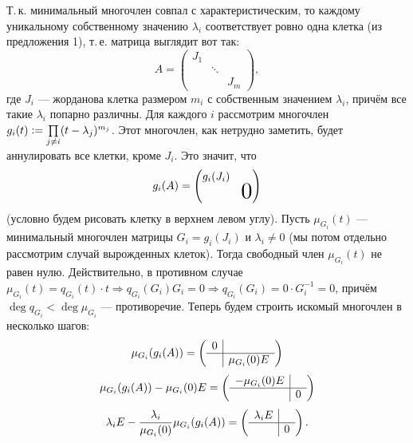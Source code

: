 \smallskip
{}
    Т.\,к. минимальный многочлен совпал с характеристическим, то каждому уникальному собственному значению $\lambda_i$ соответствует ровно одна клетка (из предложения 1), т.\,е. матрица выглядит вот так:
    \[
        A =
        \begin{pmatrix}
            J_1 & & \\
             & \ddots & \\
             & & J_m
        \end{pmatrix},
    \]
    где $J_i$ --- жорданова клетка размером $m_i$ с собственным значением $\lambda_i$, причём все такие $\lambda_i$ попарно различны. Для каждого $i$ рассмотрим многочлен $g_i(t) \vcentcolon = \prod\limits_{j \ne i}(t - \lambda_j)^{m_j}$. Этот многочлен, как нетрудно заметить, будет аннулировать все клетки, кроме $J_i$. Это значит, что
    \[
        g_i(A) =
        \begin{pmatrix}
            g_i(J_i) & \\
             & \scalebox{2}{$0$}
        \end{pmatrix}
    \]
    (условно будем рисовать клетку в верхнем левом углу). Пусть $\mu_{G_i}(t)$ --- минимальный многочлен матрицы $G_i = g_i(J_i)$ и $\lambda_i \ne 0$ (мы потом отдельно рассмотрим случай вырожденных клеток). Тогда свободный член $\mu_{G_i}(t)$ не равен нулю. Действительно, в противном случае $\mu_{G_i}(t) = q_{G_i}(t) \cdot t \Rightarrow q_{G_i}(G_i)G_i = 0 \Rightarrow q_{G_i}(G_i) = 0 \cdot G_i^{-1} = 0$, причём $\deg q_{G_i} < \deg \mu_{G_i}$ --- противоречие. Теперь будем строить искомый многочлен в несколько шагов:
    \[
        \mu_{G_i}(g_i(A)) =
        \left(
        \begin{array}{c | c}
            0 & \\
            \hline
             & \mu_{G_i}(0)E
        \end{array}
        \right)
    \]
    \[
        \mu_{G_i}(g_i(A)) - \mu_{G_i}(0)E =
        \left(
        \begin{array}{c | c}
            -\mu_{G_i}(0)E & \\
            \hline
             & 0
        \end{array}
        \right)
    \]
    \[
        \lambda_iE - \frac{\lambda_i}{\mu_{G_i}(0)}\mu_{G_i}(g_i(A)) =
        \left(
        \begin{array}{c | c}
            \lambda_iE & \\
            \hline
             & 0
        \end{array}
        \right).
    \]

